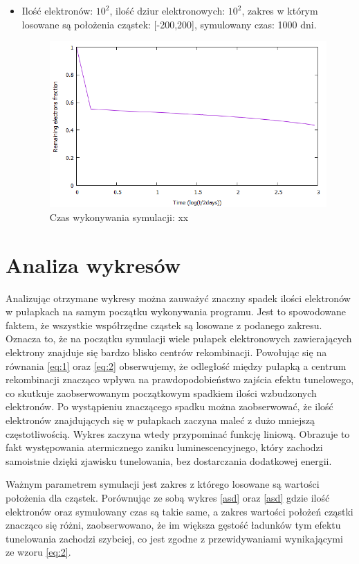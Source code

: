 \begin{itemize}
\item Ilość elektronów: $10^{2}$, ilość dziur elektronowych: $10^{2}$, zakres w którym losowane są położenia cząstek: [-200,200], symulowany czas: 1000 dni.
\begin{figure}[H]
\centering
\includegraphics[width=17cm]{wykres2}
\caption{ Czas wykonywania symulacji: xx}
\label{fig:Tunelowanie}
\end{figure}




\end{itemize}
\section{Analiza wykresów}
Analizując otrzymane wykresy można zauważyć znaczny spadek ilości elektronów w pułapkach na samym początku wykonywania programu. Jest to spowodowane faktem, że wszystkie współrzędne cząstek są losowane z podanego zakresu. Oznacza to, że na początku symulacji wiele pułapek elektronowych zawierających elektrony znajduje się bardzo blisko centrów rekombinacji. Powołując się na równania \ref{eq:1} oraz \ref{eq:2} obserwujemy, że odległość między pułapką a centrum rekombinacji znacząco wpływa na prawdopodobieństwo zajścia efektu tunelowego, co skutkuje zaobserwowanym początkowym spadkiem ilości wzbudzonych elektronów. Po wystąpieniu znaczącego spadku można zaobserwować, że ilość elektronów znajdujących się w pułapkach zaczyna maleć z dużo mniejszą częstotliwością. Wykres zaczyna wtedy przypominać funkcję liniową. Obrazuje to fakt występowania atermicznego zaniku luminescencyjnego, który zachodzi samoistnie dzięki zjawisku tunelowania, bez dostarczania dodatkowej energii. 

Ważnym parametrem symulacji jest zakres z którego losowane są wartości położenia dla cząstek. Porównując ze sobą wykres \ref{asd} oraz \ref{asd} gdzie ilość elektronów oraz symulowany czas są takie same, a zakres wartości położeń cząstki znacząco się różni, zaobserwowano, że im większa gęstość ładunków tym efektu tunelowania zachodzi szybciej, co jest zgodne z przewidywaniami wynikającymi ze wzoru \ref{eq:2}.
